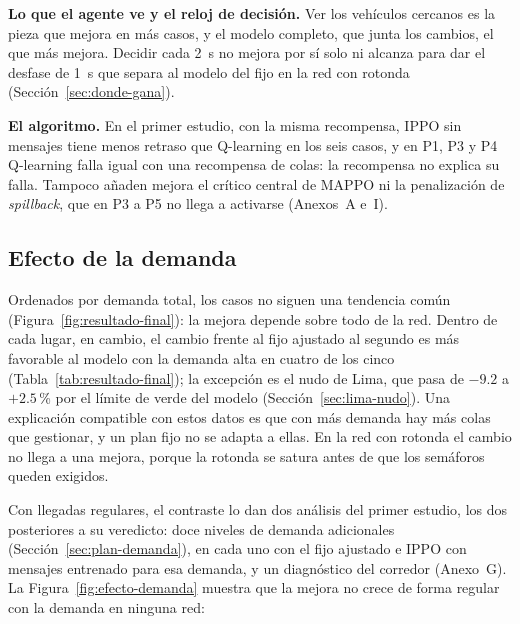 \noindent\textbf{Lo que el agente ve y el reloj de decisión.} Ver los
vehículos cercanos es la pieza que mejora en más casos, y el modelo
completo, que junta los cambios, el que más mejora. Decidir cada 2~s no
mejora por sí solo ni alcanza para dar el desfase de 1~s que separa al
modelo del fijo en la red con rotonda (Sección~\ref{sec:donde-gana}).

\noindent\textbf{El algoritmo.} En el primer estudio, con la misma
recompensa, IPPO sin mensajes tiene menos retraso que Q-learning en los
seis casos, y en P1, P3 y P4 Q-learning falla igual con una recompensa
de colas: la recompensa no explica su falla. Tampoco añaden mejora el
crítico central de MAPPO ni la penalización de \textit{spillback}, que
en P3 a P5 no llega a activarse (Anexos~A e~I).

\subsection{Efecto de la demanda}
\label{sec:efecto-demanda}
\label{sec:efecto-demanda-final}
Ordenados por demanda total, los casos no siguen una tendencia común
(Figura~\ref{fig:resultado-final}): la mejora depende sobre todo de la
red. Dentro de cada lugar, en cambio, el cambio frente al fijo ajustado
al segundo es más favorable al modelo con la demanda alta en cuatro de
los cinco (Tabla~\ref{tab:resultado-final}); la excepción es el nudo de
Lima, que pasa de $-9.2$ a $+2.5$\,\% por el límite de verde del modelo
(Sección~\ref{sec:lima-nudo}). Una explicación compatible con estos
datos es que con más demanda hay más colas que gestionar, y un plan fijo
no se adapta a ellas. En la red con rotonda el cambio no llega a una
mejora, porque la rotonda se satura antes de que los semáforos queden
exigidos.

Con llegadas regulares, el contraste lo dan dos análisis del primer
estudio, los dos posteriores a su veredicto: doce niveles de demanda
adicionales (Sección~\ref{sec:plan-demanda}), en cada uno con el fijo
ajustado e IPPO con mensajes entrenado para esa demanda, y un
diagnóstico del corredor (Anexo~G). La Figura~\ref{fig:efecto-demanda}
muestra que la mejora no crece de forma regular con la demanda en
ninguna red:

